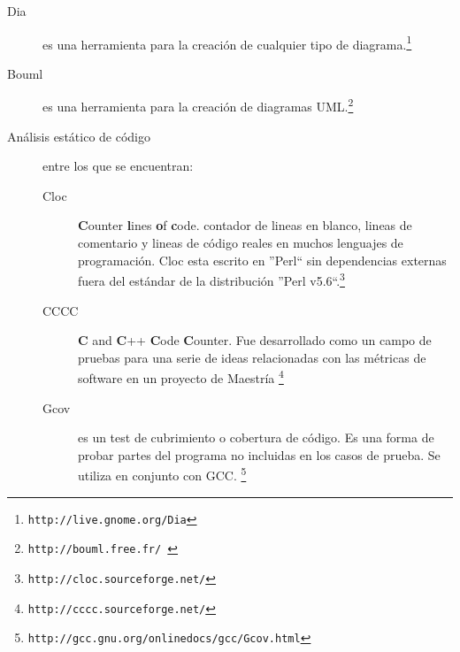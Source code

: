 \begin{description}
\item [Dia] es una herramienta para la creación de cualquier tipo de diagrama.\footnote{ {\tt http://live.gnome.org/Dia}}

\item[Bouml] es una herramienta para la creación de diagramas UML.\footnote{ {\tt http://bouml.free.fr/ }}

\item [Análisis estático de código] entre los que se encuentran:
      \begin{description}
      \item [Cloc] \textbf{C}ounter \textbf{l}ines \textbf{o}f \textbf{c}ode. contador de lineas en blanco, lineas de comentario y lineas de código reales en muchos lenguajes de programación. Cloc esta escrito en ''Perl`` sin dependencias externas fuera del estándar de la distribución ''Perl v5.6``.\footnote{ {\tt http://cloc.sourceforge.net/}}
      \item [CCCC] \textbf{C} and \textbf{C}++ \textbf{C}ode \textbf{C}ounter. Fue desarrollado como un campo de pruebas para una serie de ideas relacionadas con las métricas de software en un proyecto de Maestría \footnote{ {\tt http://cccc.sourceforge.net/}}
      \item [Gcov] es un test de cubrimiento o cobertura de código. Es una forma de probar partes del programa no incluidas en los casos de prueba. Se utiliza en conjunto con GCC. \footnote{ {\tt http://gcc.gnu.org/onlinedocs/gcc/Gcov.html}}
      \end{description}

\end{description}